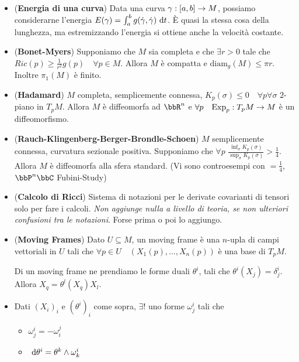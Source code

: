 \documentclass[a4paper,NoNotes,GeneralMath]{stdmdoc}
\newcommand{\Exp}{\ensuremath{\text{Exp}}}
\begin{document}
\begin{itemize}
\begin{enumerate}
  \end{enumerate}
\item ({\bf Energia di una curva}) Data una curva $\gamma: [a, b] \rightarrow M$, possiamo considerarne l'energia $E(\gamma) = \int_a^b g(\dot\gamma, \dot\gamma) \de t$. È quasi la stessa cosa della lunghezza, ma estremizzando l'energia si ottiene anche la velocità costante.
\item ({\bf Bonet-Myers}) Supponiamo che $M$ sia completa e che $\exists r > 0$ tale che $Ric(p) \ge \frac{1}{r^2} g(p) \quad \forall p \in M$. Allora $M$ è compatta e $\text{diam}_g (M) \le \pi r$. Inoltre $\pi_1(M)$ è finito.
\item ({\bf Hadamard}) $M$ completa, semplicemente connessa, $K_p (\sigma) \le 0 \quad \forall p \forall \sigma$ $2$-piano in $T_pM$. Allora $M$ è diffeomorfa ad $\bbR^n$ e $\forall p \quad \Exp_p : T_pM \rar M$ è un diffeomorfismo.
\item ({\bf Rauch-Klingenberg-Berger-Brondle-Schoen}) $M$ semplicemente connessa, curvatura sezionale positiva. Supponiamo che $\forall p$ $\frac{\inf_\sigma K_p (\sigma)}{\sup_\sigma K_p (\sigma)} > \frac{1}{4}$. Allora $M$ è diffeomorfa alla sfera standard. (Vi sono controesempi con $=\frac{1}{4}$, $\bbP^n\bbC$ Fubini-Study)
\item ({\bf Calcolo di Ricci}) Sistema di notazioni per le derivate covarianti di tensori solo per fare i calcoli. {\it Non aggiunge nulla a livello di teoria, se non ulteriori confusioni tra le notazioni}. Forse prima o poi lo aggiungo.
\item ({\bf Moving Frames}) Dato $U \subseteq M$, un moving frame è una $n$-upla di campi vettoriali in $U$ tali che $\forall p \in U \quad (X_1(p), \ldots, X_n(p))$ è una base di $T_pM$.

  Di un moving frame ne prendiamo le forme duali $\theta^i$, tali che $\theta^i(X_j) = \delta^i_j$. Allora $X_q = \theta^l(X_q) X_l$.
\item Dati $(X_i)_i$ e $(\theta^i)_i$ come sopra, $\exists!$ uno forme $\omega^i_j$ tali che
  \begin{itemize}
  \item $\omega^i_j = - \omega^j_i$
  \item $\de \theta^i = \theta^k \wedge \omega^i_k$
  \end{itemize}


\end{itemize}
\end{document}
